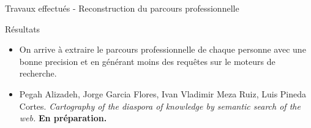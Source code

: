 \documentclass{beamer}
\begin{document}
{{\begin{frame}{Travaux effectués - Reconstruction du parcours professionnelle}
\begin{block}{Résultats}
\begin{itemize}
\item On arrive à extraire le parcours professionnelle de chaque personne avec une bonne precision et en générant moins des requêtes sur le moteurs de recherche.  
\end{itemize}
\end{block}

\begin{itemize}
\small
\item  Pegah Alizadeh, Jorge Garcia Flores, Ivan Vladimir Meza Ruiz, Luis Pineda Cortes.
\textit{Cartography of the diaspora of knowledge by semantic search of the web.} \textbf{En préparation.}
\end{itemize}

\end{frame}


%


}}
\end{document}
